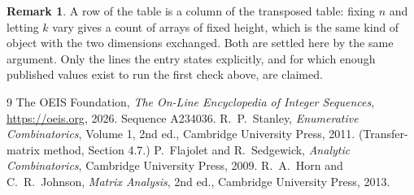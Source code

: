 \documentclass[11pt,a4paper]{article}
\theoremstyle{plain}
\theoremstyle{definition}
\newtheorem{remark}[theorem]{Remark}
\begin{document}
\begin{remark}
A row of the table is a column of the transposed table: fixing $n$ and letting $k$ vary gives a
count of arrays of fixed height, which is the same kind of object with the two dimensions
exchanged. Both are settled here by the same argument. Only the lines the entry states
explicitly, and for which enough published values exist to run the first check above, are
claimed.
\end{remark}

\begin{thebibliography}{9}
 The OEIS Foundation, \emph{The On-Line Encyclopedia of Integer
Sequences}, \url{https://oeis.org}, 2026. Sequence A234036.
 R.~P.~Stanley, \emph{Enumerative Combinatorics}, Volume 1, 2nd ed.,
Cambridge University Press, 2011. (Transfer-matrix method, Section 4.7.)
 P.~Flajolet and R.~Sedgewick, \emph{Analytic Combinatorics}, Cambridge
University Press, 2009.
 R.~A.~Horn and C.~R.~Johnson, \emph{Matrix Analysis}, 2nd ed., Cambridge
University Press, 2013.
\end{thebibliography}
\end{document}
